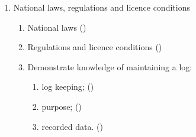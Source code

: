 \begin{flushleft}
\begin{enumerate}
\item National laws, regulations and licence conditions
\begin{enumerate}
\item National laws
  ()\label{HAREC.c.3.1}
\item Regulations and licence conditions
  ()\label{HAREC.c.3.2}
\item Demonstrate knowledge of maintaining a log:
\begin{enumerate}
\item log keeping; ()\label{HAREC.c.3.3.1}
\item purpose; ()\label{HAREC.c.3.3.2}
\item recorded data. ()\label{HAREC.c.3.3.3}
\end{enumerate}
\end{enumerate}
\end{enumerate}

\end{flushleft}

